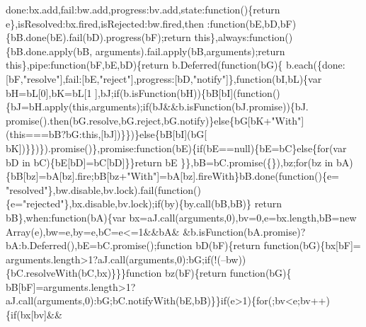 \begin{DoxyCode}
      done:bx.add,fail:bw.add,progress:bv.add,state:\textcolor{keyword}{function}()\{\textcolor{keywordflow}{return} e\},isResolved:bx.fired,isRejected:bw.fired,then
      :\textcolor{keyword}{function}(bE,bD,bF)\{bB.done(bE).fail(bD).progress(bF);\textcolor{keywordflow}{return} \textcolor{keyword}{this}\},always:\textcolor{keyword}{function}()\{bB.done.apply(bB,
      arguments).fail.apply(bB,arguments);\textcolor{keywordflow}{return} \textcolor{keyword}{this}\},pipe:\textcolor{keyword}{function}(bF,bE,bD)\{\textcolor{keywordflow}{return} b.Deferred(\textcolor{keyword}{function}(bG)\{
      b.each(\{done:[bF,\textcolor{stringliteral}{"resolve"}],fail:[bE,\textcolor{stringliteral}{"reject"}],progress:[bD,\textcolor{stringliteral}{"notify"}]\},\textcolor{keyword}{function}(bI,bL)\{var bH=bL[0],bK=bL[1
      ],bJ;\textcolor{keywordflow}{if}(b.isFunction(bH))\{bB[bI](\textcolor{keyword}{function}()\{bJ=bH.apply(\textcolor{keyword}{this},arguments);\textcolor{keywordflow}{if}(bJ&&b.isFunction(bJ.promise))\{bJ.
      promise().then(bG.resolve,bG.reject,bG.notify)\}\textcolor{keywordflow}{else}\{bG[bK+\textcolor{stringliteral}{"With"}](\textcolor{keyword}{this}===bB?bG:\textcolor{keyword}{this},[bJ])\}\})\}\textcolor{keywordflow}{else}\{bB[bI](bG[
      bK])\}\})\}).promise()\},promise:\textcolor{keyword}{function}(bE)\{\textcolor{keywordflow}{if}(bE==null)\{bE=bC\}\textcolor{keywordflow}{else}\{\textcolor{keywordflow}{for}(var bD in bC)\{bE[bD]=bC[bD]\}\}\textcolor{keywordflow}{return} bE
      \}\},bB=bC.promise(\{\}),bz;\textcolor{keywordflow}{for}(bz in bA)\{bB[bz]=bA[bz].fire;bB[bz+\textcolor{stringliteral}{"With"}]=bA[bz].fireWith\}bB.done(\textcolor{keyword}{function}()\{e=\textcolor{stringliteral}{
      "resolved"}\},bw.disable,bv.lock).fail(\textcolor{keyword}{function}()\{e=\textcolor{stringliteral}{"rejected"}\},bx.disable,bv.lock);\textcolor{keywordflow}{if}(by)\{by.call(bB,bB)\}\textcolor{keywordflow}{
      return} bB\},when:\textcolor{keyword}{function}(bA)\{var bx=aJ.call(arguments,0),bv=0,e=bx.length,bB=\textcolor{keyword}{new} Array(e),bw=e,by=e,bC=e<=1&&bA&
      &b.isFunction(bA.promise)?bA:b.Deferred(),bE=bC.promise();\textcolor{keyword}{function} bD(bF)\{\textcolor{keywordflow}{return} \textcolor{keyword}{function}(bG)\{bx[bF]=
      arguments.length>1?aJ.call(arguments,0):bG;\textcolor{keywordflow}{if}(!(--bw))\{bC.resolveWith(bC,bx)\}\}\}\textcolor{keyword}{function} bz(bF)\{\textcolor{keywordflow}{return} \textcolor{keyword}{function}(bG)\{
      bB[bF]=arguments.length>1?aJ.call(arguments,0):bG;bC.notifyWith(bE,bB)\}\}\textcolor{keywordflow}{if}(e>1)\{\textcolor{keywordflow}{for}(;bv<e;bv++)\{\textcolor{keywordflow}{if}(bx[bv]&&

\end{DoxyCode}
